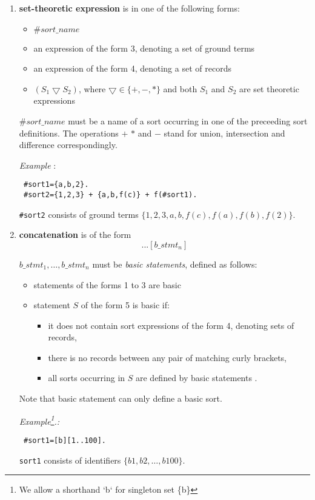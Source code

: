 \documentclass[12pt, letterpaper]{article}
\begin{document}
\begin{enumerate}
 \item \textbf{set-theoretic expression} is in one of the following forms:
\begin{itemize}
\item $\#sort\_name$  
\item an expression of the form 3, denoting a set of ground terms
\item an expression of the form 4, denoting a set of records
\item $(S_1 \bigtriangledown S_2)$, where $\bigtriangledown \in \{+,-,*\}$ and both $S_1$ and $S_2$ are set theoretic expressions
\end{itemize}

$\#sort\_name$ must be a name of a sort occurring in one of the preceeding sort definitions. 
The operations $+$ $*$ and $-$ stand for union, intersection and difference correspondingly.


\textit{Example} : 
\begin{verbatim}
 #sort1={a,b,2}.
 #sort2={1,2,3} + {a,b,f(c)} + f(#sort1).
\end{verbatim}
 \texttt{\#sort2} consists of ground terms $\{1,2,3,a,b,f(c),f(a),f(b),f(2)\}$.
\item \textbf{concatenation} is of the form
\begin{equation*}
 [b\_stmt_1] ... [b\_stmt_n]
\end{equation*}

$b\_stmt_1, \dots, b\_stmt_n$ must be \textit{basic statements}, defined as follows:


\begin{itemize}
 \item statements of the forms 1 to 3 are basic
 \item statement $S$ of the form 5 is basic if:
 \begin{itemize}
 \item it does not contain sort expressions of the form 4, denoting sets of records,
  \item there is no records between any pair of matching curly brackets,
  \item all sorts occurring in $S$ are defined by basic statements .
 \end{itemize}
\end{itemize}
Note that basic statement can only define a basic sort.

\textit{Example\footnote{We allow a shorthand `b` for singleton  set \{b\}}.:}

\begin{verbatim}
 #sort1=[b][1..100].
\end{verbatim}

\texttt{sort1} consists of identifiers $\{b1,b2,\dots, b100\}$.

\end{enumerate}
\end{document}

